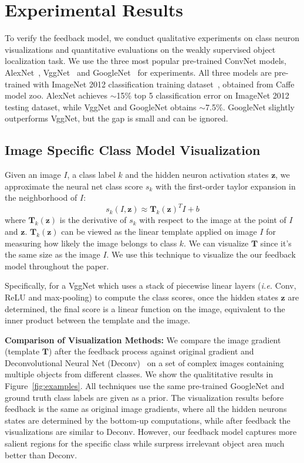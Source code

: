 \section{Experimental Results}
\label{sec:experiment}

To verify the feedback model, we conduct qualitative experiments on class neuron visualizations and quantitative evaluations on the weakly supervised object localization task. We use the three most popular pre-trained ConvNet models, AlexNet~\cite{Krizhevsky2012ImageNet}, VggNet~\cite{simonyan2013deep} and GoogleNet~\cite{Szegedy2014Going} for experiments. All three models are pre-trained with ImageNet 2012 classification training dataset~\cite{deng2009imagenet}, obtained from Caffe~\cite{jia2014caffe} model zoo. AlexNet achieves $\sim$15\% top 5 classification error on ImageNet 2012 testing dataset, while VggNet and GoogleNet obtains $\sim$7.5\%. GoogleNet slightly outperforms VggNet, but the gap is small and can be ignored. 

\subsection{Image Specific Class Model Visualization}
\label{subsec:visualization}
Given an image $I$, a class label $k$ and the hidden neuron activation states $\mathbf{z}$, we approximate the neural net class score $s_k$ with the first-order taylor expansion in the neighborhood of $I$:
\begin{equation}
  s_k(I, \mathbf{z}) \approx  \mathbf{T}_k(\mathbf{z})^T I + b
\end{equation}
where $\mathbf{T}_k(\mathbf{z})$ is the derivative of $s_k$ with respect to the image at the point of $I$ and $\mathbf{z}$. $\mathbf{T}_k(\mathbf{z})$ can be viewed as the linear template applied on image $I$ for measuring how likely the image belongs to class $k$. We can visualize $\mathbf{T}$ since it's the same size as the image $I$. We use this technique to visualize the our feedback model throughout the paper.

Specifically, for a VggNet which uses a stack of piecewise linear layers (\emph{i.e.} Conv, ReLU and max-pooling) to compute the class scores, once the hidden states $\mathbf{z}$ are determined, the final score is a linear function on the image, equivalent to the inner product between the template and the image.

\textbf{Comparison of Visualization Methods:} We compare the image gradient (template $\mathbf{T}$) after the feedback process against original gradient and Deconvolutional Neural Net (Deconv)~\cite{zeiler2014visualizing} on a set of complex images containing multiple objects from different classes. We show the qualititative results in Figure~\ref{fig:examples}. All techniques use the same pre-trained GoogleNet and ground truth class labels are given as a prior. The visualization results before feedback is the same as original image gradients, where all the hidden neurons states are determined by the bottom-up computations, while after feedback the visualizations are similar to Deconv. However, our feedback model captures more salient regions for the specific class while surpress irrelevant object area much better than Deconv.  

